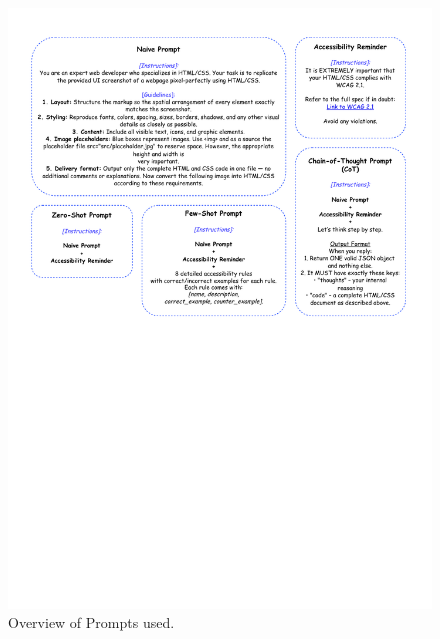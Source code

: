 \newpage








\begin{figure}[htbp]
  \centering
  \includegraphics[page=1,width=\linewidth,trim=0cm 14cm 0cm 0cm,clip,]{figures/prompts.pdf}
  \caption{Overview of Prompts used.}
  \label{fig:prompt-overview}
\end{figure}







\newpage









